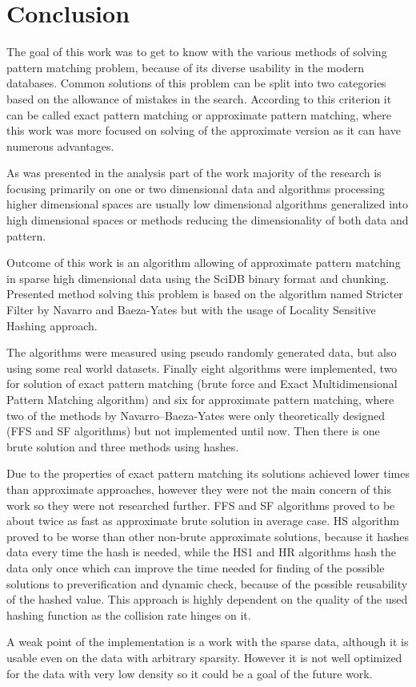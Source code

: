 \chapter{Conclusion} \label{conclusion}
The goal of this work was to get to know with the various methods of solving pattern matching problem, because of its diverse usability in the modern databases. Common solutions of this problem can be split into two categories based on the allowance of mistakes in the search. According to this criterion it can be called exact pattern matching or approximate pattern matching, where this work was more focused on solving of the approximate version as it can have numerous advantages. 

As was presented in the analysis part of the work majority of the research is focusing primarily on one or two dimensional data and algorithms processing higher dimensional spaces are usually low dimensional algorithms generalized into high dimensional spaces or methods reducing the dimensionality of both data and pattern. 

Outcome of this work is an algorithm allowing of approximate pattern matching in sparse high dimensional data using the SciDB binary format and chunking. Presented method solving this problem is based on the algorithm named Stricter Filter by Navarro and Baeza-Yates but with the usage of Locality Sensitive Hashing approach. 

The algorithms were measured using pseudo randomly generated data, but also using some real world datasets. Finally eight algorithms were implemented, two for solution of exact pattern matching (brute force and Exact Multidimensional Pattern Matching algorithm) and six for approximate pattern matching, where two of the methods by Navarro--Baeza-Yates were only theoretically designed (FFS and SF algorithms) but not implemented until now. Then there is one brute solution and three methods using hashes.

Due to the properties of exact pattern matching its solutions achieved lower times than approximate approaches, however they were not the main concern of this work so they were not researched further.
FFS and SF algorithms proved to be about twice as fast as approximate brute solution in average case.
HS algorithm proved to be worse than other non-brute approximate solutions, because it hashes data every time the hash is needed, while the HS1 and HR algorithms hash the data only once which can improve the time needed for finding of the possible solutions to preverification and dynamic check, because of the possible reusability of the hashed value. This approach is highly dependent on the quality of the used hashing function as the collision rate hinges on it.

A weak point of the implementation is a work with the sparse data, although it is usable even on the data with arbitrary sparsity. However it is not well optimized for the data with very low density so it could be a goal of the future work. 